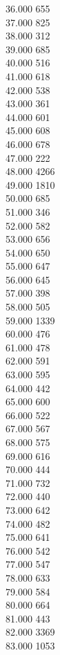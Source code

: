 { 36.000	655 \\
 37.000	825 \\
 38.000	312 \\
 39.000	685 \\
 40.000	516 \\
 41.000	618 \\
 42.000	538 \\
 43.000	361 \\
 44.000	601 \\
 45.000	608 \\
 46.000	678 \\
 47.000	222 \\
 48.000	4266 \\
 49.000	1810 \\
 50.000	685 \\
 51.000	346 \\
 52.000	582 \\
 53.000	656 \\
 54.000	650 \\
 55.000	647 \\
 56.000	645 \\
 57.000	398 \\
 58.000	505 \\
 59.000	1339 \\
 60.000	476 \\
 61.000	478 \\
 62.000	591 \\
 63.000	595 \\
 64.000	442 \\
 65.000	600 \\
 66.000	522 \\
 67.000	567 \\
 68.000	575 \\
 69.000	616 \\
 70.000	444 \\
 71.000	732 \\
 72.000	440 \\
 73.000	642 \\
 74.000	482 \\
 75.000	641 \\
 76.000	542 \\
 77.000	547 \\
 78.000	633 \\
 79.000	584 \\
 80.000	664 \\
 81.000	443 \\
 82.000	3369 \\
 83.000	1053 \\
}
